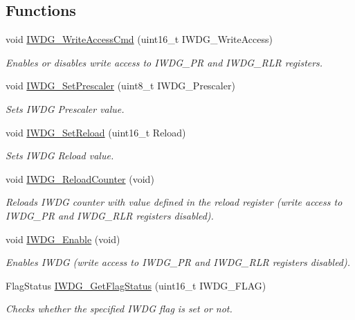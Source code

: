 \subsection*{Functions}
\begin{DoxyCompactItemize}
\item 
void \hyperlink{group___i_w_d_g_gae466681e5bdc11b353c508b89d75ca05}{I\+W\+D\+G\+\_\+\+Write\+Access\+Cmd} (uint16\+\_\+t I\+W\+D\+G\+\_\+\+Write\+Access)
\begin{DoxyCompactList}\small\item\em Enables or disables write access to I\+W\+D\+G\+\_\+\+P\+R and I\+W\+D\+G\+\_\+\+R\+L\+R registers. \end{DoxyCompactList}\item 
void \hyperlink{group___i_w_d_g_ga4fa7f1cd690533a35ad9e4729c0450a3}{I\+W\+D\+G\+\_\+\+Set\+Prescaler} (uint8\+\_\+t I\+W\+D\+G\+\_\+\+Prescaler)
\begin{DoxyCompactList}\small\item\em Sets I\+W\+D\+G Prescaler value. \end{DoxyCompactList}\item 
void \hyperlink{group___i_w_d_g_gae2a14752a0431f23cb80cebf202ac365}{I\+W\+D\+G\+\_\+\+Set\+Reload} (uint16\+\_\+t Reload)
\begin{DoxyCompactList}\small\item\em Sets I\+W\+D\+G Reload value. \end{DoxyCompactList}\item 
void \hyperlink{group___i_w_d_g_ga7147ebabdc3fef97f532b171a4e70d49}{I\+W\+D\+G\+\_\+\+Reload\+Counter} (void)
\begin{DoxyCompactList}\small\item\em Reloads I\+W\+D\+G counter with value defined in the reload register (write access to I\+W\+D\+G\+\_\+\+P\+R and I\+W\+D\+G\+\_\+\+R\+L\+R registers disabled). \end{DoxyCompactList}\item 
void \hyperlink{group___i_w_d_g_ga479b2921c86f8c67b819f5c4bea6bdb6}{I\+W\+D\+G\+\_\+\+Enable} (void)
\begin{DoxyCompactList}\small\item\em Enables I\+W\+D\+G (write access to I\+W\+D\+G\+\_\+\+P\+R and I\+W\+D\+G\+\_\+\+R\+L\+R registers disabled). \end{DoxyCompactList}\item 
Flag\+Status \hyperlink{group___i_w_d_g_ga37f050cfbedc0c15f9e0816c0b22011e}{I\+W\+D\+G\+\_\+\+Get\+Flag\+Status} (uint16\+\_\+t I\+W\+D\+G\+\_\+\+F\+L\+A\+G)
\begin{DoxyCompactList}\small\item\em Checks whether the specified I\+W\+D\+G flag is set or not. \end{DoxyCompactList}\end{DoxyCompactItemize}


